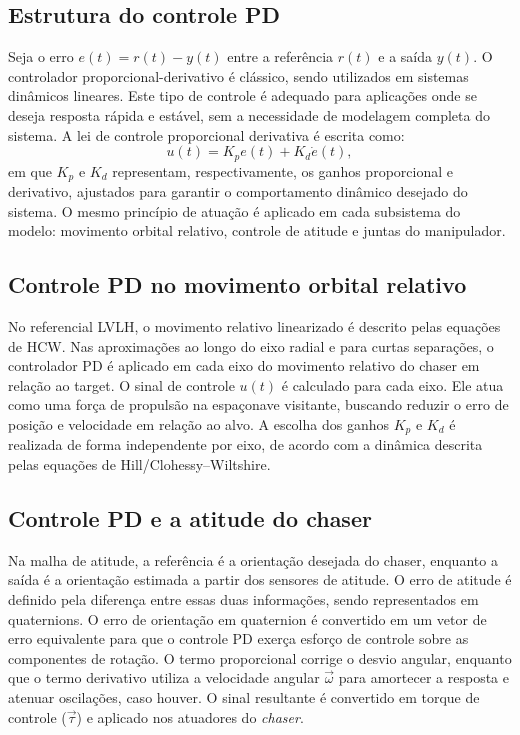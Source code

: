 \subsection{Estrutura do controle PD}
Seja o erro $e(t)=r(t)-y(t)$ entre a referência $r(t)$ e a saída $y(t)$.
O controlador proporcional-derivativo é clássico, sendo utilizados em sistemas dinâmicos lineares.
Este tipo de controle é adequado para aplicações onde se deseja resposta rápida e estável, sem a necessidade de modelagem completa do sistema.
A lei de controle proporcional derivativa é escrita como:
\begin{equation}
\label{eq:pd_law}
u(t) = K_p e(t) + K_d \dot e(t),
\end{equation}
em que $K_p$ e $K_d$ representam, respectivamente, os ganhos proporcional e derivativo, ajustados para garantir o comportamento dinâmico desejado do sistema.
O mesmo princípio de atuação é aplicado em cada subsistema do modelo: movimento orbital relativo, controle de atitude e juntas do manipulador.

\subsection{Controle PD no movimento orbital relativo}
No referencial LVLH, o movimento relativo linearizado é descrito pelas equações de HCW.  
Nas aproximações ao longo do eixo radial e para curtas separações, o controlador PD é aplicado em cada eixo do movimento relativo do chaser em relação ao target.
O sinal de controle $u(t)$ é calculado para cada eixo.
Ele atua como uma força de propulsão na espaçonave visitante, buscando reduzir o erro de posição e velocidade em relação ao alvo.
A escolha dos ganhos $K_p$ e $K_d$ é realizada de forma independente por eixo, de acordo com a dinâmica descrita pelas equações de Hill/Clohessy--Wiltshire.


\subsection{Controle PD e a atitude do chaser}
Na malha de atitude, a referência é a orientação desejada do chaser, enquanto a saída é a orientação estimada a partir dos sensores de atitude.
O erro de atitude é definido pela diferença entre essas duas informações, sendo representados em quaternions.
O erro de orientação em quaternion é convertido em um vetor de erro equivalente para que o controle PD exerça esforço de controle sobre as componentes de rotação.
O termo proporcional corrige o desvio angular, enquanto que o termo derivativo utiliza a velocidade angular $\vec \omega$ para amortecer a resposta e atenuar oscilações, caso houver.
O sinal resultante é convertido em torque de controle ($\vec \tau$) e aplicado nos atuadores do \emph{chaser}.

